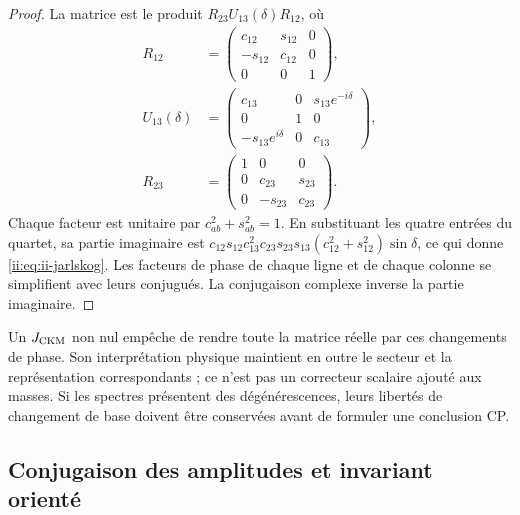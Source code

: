 \begin{proof}
La matrice est le produit \(R_{23}U_{13}(\delta)R_{12}\), où
\begin{equation}
\begin{aligned}
 R_{12}&=\begin{pmatrix}c_{12}&s_{12}&0\\-s_{12}&c_{12}&0\\0&0&1\end{pmatrix},
 \\
 U_{13}(\delta)&=
 \begin{pmatrix}c_{13}&0&s_{13}e^{-i\delta}\\0&1&0\\
 -s_{13}e^{i\delta}&0&c_{13}\end{pmatrix},
 \\
 R_{23}&=\begin{pmatrix}1&0&0\\0&c_{23}&s_{23}\\0&-s_{23}&c_{23}\end{pmatrix}.
\end{aligned}
 \label{ii:eq:ii-ckm-factorization}
\end{equation}
Chaque facteur est unitaire par \(c_{ab}^2+s_{ab}^2=1\).
En substituant les quatre entrées du quartet, sa partie imaginaire est
\(c_{12}s_{12}c_{13}^2c_{23}s_{23}s_{13}
(c_{12}^2+s_{12}^2)\sin\delta\), ce qui donne
\eqref{ii:eq:ii-jarlskog}. Les facteurs de phase de chaque ligne et de chaque colonne
se simplifient avec leurs conjugués. La conjugaison complexe inverse la partie
imaginaire.
\end{proof}

Un \(J_{\rm CKM}\) non nul empêche de rendre toute la matrice réelle par
ces changements de phase. Son interprétation physique maintient en outre le secteur
et la représentation correspondants ; ce n'est pas un correcteur scalaire ajouté
aux masses. Si les spectres présentent des dégénérescences, leurs libertés de
changement de base doivent être conservées avant de formuler une conclusion CP.


\subsection{Conjugaison des amplitudes et invariant orienté}
\label{ii:sec:ii09-conjugacion-amplitudes}

